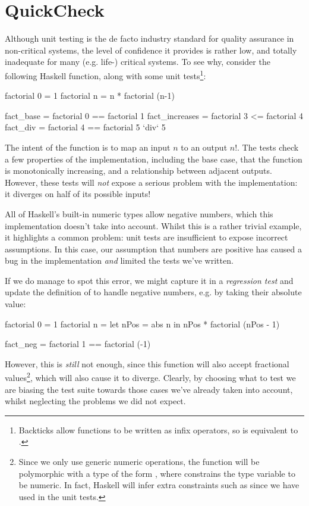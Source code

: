 \section{QuickCheck}
\label{sec:quickcheck}

Although unit testing is the de facto industry standard for quality assurance in
non-critical systems, the level of confidence it provides is rather low, and
totally inadequate for many (e.g. life-) critical systems. To see why, consider
the following Haskell function, along with some unit
tests\footnote{Backticks allow functions to be written as infix operators, so
   is equivalent to .}:

\begin{haskell}
factorial 0 = 1
factorial n = n * factorial (n-1)

fact_base      = factorial 0 == factorial 1
fact_increases = factorial 3 <= factorial 4
fact_div       = factorial 4 == factorial 5 `div` 5
\end{haskell}

The intent of the function is to map an input $n$ to an output $n!$. The tests
check a few properties of the implementation, including the base case, that the
function is monotonically increasing, and a relationship between adjacent
outputs. However, these tests will \emph{not} expose a serious problem with the
implementation: it diverges on half of its possible inputs!

All of Haskell's built-in numeric types allow negative numbers, which this
implementation doesn't take into account. Whilst this is a rather trivial
example, it highlights a common problem: unit tests are insufficient to expose
incorrect assumptions. In this case, our assumption that numbers are positive
has caused a bug in the implementation \emph{and} limited the tests we've
written.

If we do manage to spot this error, we might capture it in a \emph{regression
  test} and update the definition of  to handle negative numbers,
e.g. by taking their absolute value:

\begin{haskell}
factorial 0 = 1
factorial n = let nPos = abs n
               in nPos * factorial (nPos - 1)

fact_neg = factorial 1 == factorial (-1)
\end{haskell}

However, this is \emph{still} not enough, since this function will also accept
fractional values\footnote{Since we only use generic numeric operations, the
  function will be polymorphic with a type of the form , where  constrains the type variable  to be
  numeric. In fact, Haskell will infer extra constraints such as  since
  we have used \hs{==} in the unit tests.}, which will also cause it to
diverge. Clearly, by choosing what to test we are biasing the test suite towards
those cases we've already taken into account, whilst neglecting the problems we
did not expect.

